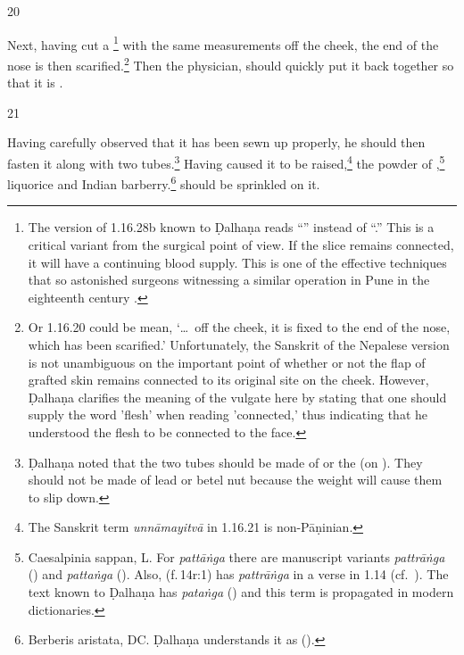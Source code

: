 \begin{translation}
\item[20] 

\begin{sloka}
    Next, having cut a \footnote{The
    version of 1.16.28b known to Ḍalhaṇa \citep[81]{vulgate} reads “” instead of “.”
    This is a critical variant from the surgical point of view.  If the slice remains
    connected, it will have a continuing blood supply.  This is one of the effective 
    techniques that so astonished surgeons witnessing a similar operation in Pune in
    the eighteenth century \citep[see][67--70]{wuja-2003}.} with the same
    measurements off the cheek, the end of the nose is then scarified.\footnote{Or 1.16.20 
    could be mean, 
    `\ldots\ off the cheek, it is fixed to the end of the nose, which has been
    scarified.' Unfortunately, the Sanskrit of the Nepalese version is not unambiguous on the
    important point of whether or not the flap of grafted skin remains connected
    to its original site on the cheek. However, Ḍalhaṇa \citep[81]{vulgate} clarifies the 
    meaning of the vulgate here by stating that one should supply the word 'flesh' when 
    reading 'connected,' thus indicating that he understood the flesh to be connected to the 
    face.} %
%
Then the  physician, 
    should quickly put it back together so that it is 
    .
    \label{well-joined}
\end{sloka}  


\item[21] 
\begin{sloka}
Having carefully observed that it has been sewn up properly, he should then fasten
it along with two tubes.\footnote{Ḍalhaṇa noted that the two tubes should be made
    of  or the  (on ). They should not be made of lead or betel nut because
    the weight will cause them to slip down.} Having caused it to be
    raised,\footnote{The Sanskrit term \emph{unnāmayitvā} in 1.16.21 is non-Pāṇinian.}
        the powder of ,\footnote{Caesalpinia sappan, L. %
            For \emph{pattāṅga} there are manuscript variants \emph{pattrāṅga}
            () and \emph{pattaṅga} ().  Also,  (f.\,14r:1) has \emph{pattrāṅga} in
            a verse in 1.14 (cf.\ ). The text known to Ḍalhaṇa  has
            \emph{pataṅga} () and this term is propagated in modern
            dictionaries.} %
            {liquorice} %
            and Indian barberry.\footnote{Berberis aristata, DC. %
                Ḍalhaṇa understands it as 
                (\cite[81]{vulgate}).} should be sprinkled on it.


\end{sloka}
\end{translation}
